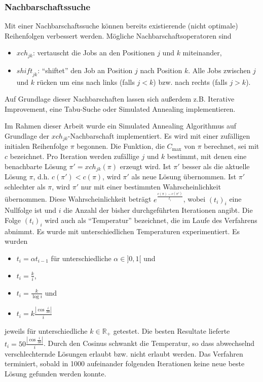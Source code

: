 \documentclass{scrreprt}
\begin{document}
\subsubsection{Nachbarschaftssuche}
\label{subsubsec:Nachbarschaftssuche}
Mit einer Nachbarschaftssuche können bereits existierende (nicht optimale) Reihenfolgen verbessert werden.
Mögliche Nachbarschaftsoperatoren sind
\begin{itemize}
    \item $\mathit{xch}_{jk}$: vertauscht die Jobs an den Positionen $j$ und $k$ miteinander,
    \item $\mathit{shift}_{jk}$: "`shiftet"' den Job an Position $j$ nach Position $k$. 
        Alle Jobs zwischen $j$ und $k$ rücken um eins nach links (falls $j<k$) bzw. nach rechts (falls $j>k$).
\end{itemize}
Auf Grundlage dieser Nachbarschaften lassen sich außerdem z.B. Iterative Improvement, eine Tabu-Suche oder Simulated Annealing implementieren.

Im Rahmen dieser Arbeit wurde ein Simulated Annealing Algorithmus auf Grundlage der $\mathit{xch}_{jk}$-Nachbarschaft implementiert.
Es wird mit einer zufälligen initialen Reihenfolge $\pi$ begonnen.
Die Funktion, die $C_{\max}$ von $\pi$ berechnet, sei mit $c$ bezeichnet.
Pro Iteration werden zufällige $j$ und $k$ bestimmt, mit denen eine benachbarte Lösung $\pi' = \mathit{xch}_{jk}(\pi)$ erzeugt wird.
Ist $\pi'$ besser als die aktuelle Lösung $\pi$, d.h. $c(\pi') < c(\pi)$, wird $\pi'$ als neue Lösung übernommen.
Ist $\pi'$ schlechter als $\pi$, wird $\pi'$ nur mit einer bestimmten Wahrscheinlichkeit übernommen.
Diese Wahrscheinlichkeit beträgt $e^{\frac{c(\pi)-c(\pi')}{t_i}}$, wobei $(t_i)_i$ eine Nullfolge ist 
und $i$ die Anzahl der bisher durchgeführten Iterationen angibt.
Die Folge $(t_i)_i$ wird auch als "`Temperatur"' bezeichnet, die im Laufe des Verfahrens abnimmt.
Es wurde mit unterschiedlichen Temperaturen experimentiert.
Es wurden 
\begin{itemize}
    \item $t_i = \alpha t_{i-1}$ für unterschiedliche $\alpha\in]0,1[$ und 
    \item $t_i = \frac{k}{i}$, 
    \item $t_i = \frac{k}{\log i}$ und 
    \item $t_i = k \frac{|\cos\frac{i}{30}|}{i}$
\end{itemize}
jeweils für unterschiedliche $k\in\mathbb{R}_+$ getestet. Die besten Resultate lieferte $t_i = 50\frac{|\cos\frac{i}{30}|}{i}$.
Durch den Cosinus schwankt die Temperatur, so dass abwechselnd verschlechternde Lösungen erlaubt bzw. nicht erlaubt werden.
Das Verfahren terminiert, sobald in 1000 aufeinander folgenden Iterationen keine neue beste Lösung gefunden werden konnte.
\end{document}
